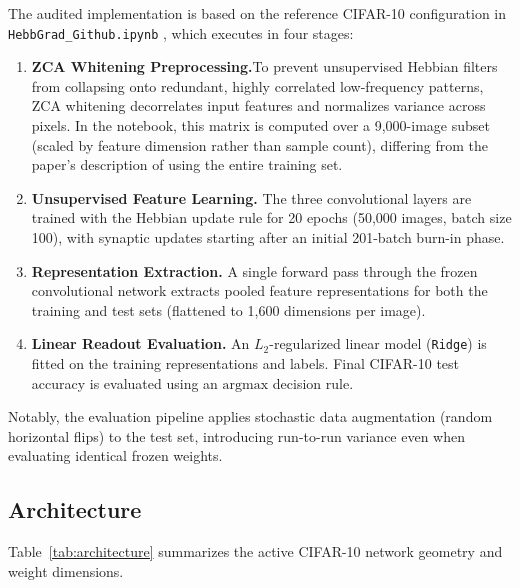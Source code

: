 \documentclass{article}
\begin{document}
    The audited implementation is based on the reference CIFAR-10 configuration in \texttt{HebbGrad\_Github.ipynb} \cite{miconi2021repo}, which executes in four stages:
\begin{enumerate}
    \item \textbf{ZCA Whitening Preprocessing.}To prevent unsupervised Hebbian filters from collapsing onto redundant, highly correlated low-frequency patterns, ZCA whitening decorrelates input features and normalizes variance across pixels. In the notebook, this matrix is computed over a 9,000-image subset (scaled by feature dimension rather than sample count), differing from the paper's description of using the entire training set.
    \item \textbf{Unsupervised Feature Learning.} The three convolutional layers are trained with the Hebbian update rule for 20 epochs (50,000 images, batch size 100), with synaptic updates starting after an initial 201-batch burn-in phase.
\item \textbf{Representation Extraction.} A single forward pass through the frozen convolutional network extracts pooled feature representations for both the training and test sets (flattened to 1,600 dimensions per image).
\item \textbf{Linear Readout Evaluation.} An $L_2$-regularized linear model (\texttt{Ridge}) is fitted on the training representations and labels. Final CIFAR-10 test accuracy is evaluated using an $\mathrm{argmax}$ decision rule.
\end{enumerate}

Notably, the evaluation pipeline applies stochastic data augmentation (random horizontal flips) to the test set, introducing run-to-run variance even when evaluating identical frozen weights.
    
    \subsection{Architecture}
    
    Table~\ref{tab:architecture} summarizes the active CIFAR-10 network geometry and weight dimensions.
    
\end{document}
